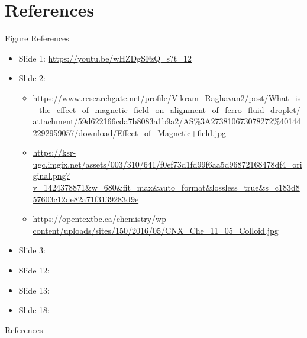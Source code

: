 \documentclass[9pt]{beamer}
\begin{document}
\section{References}
\begin{frame}{Figure References}
\begin{itemize}
	\item Slide 1: \url{https://youtu.be/wHZDgSFzQ_s?t=12}
	\item Slide 2:
	\begin{itemize}
		\item \url{https://www.researchgate.net/profile/Vikram\_Raghavan2/post/What\_is\_the\_effect\_of\_magnetic\_field\_on\_alignment\_of\_ferro\_fluid\_droplet/attachment/59d622166cda7b8083a1b9a2/AS\%3A273810673078272\%401442292959057/download/Effect+of+Magnetic+field.jpg}
		\item \url{https://ksr-ugc.imgix.net/assets/003/310/641/f0ef73d1fd99f6aa5d96872168478df4\_original.png?v=1424378871\&w=680\&fit=max\&auto=format\&lossless=true\&s=c183d857603c12de82a71f3139283d9e}
		\item \url{https://opentextbc.ca/chemistry/wp-content/uploads/sites/150/2016/05/CNX\_Che\_11\_05\_Colloid.jpg}
	\end{itemize}
	\item Slide 3: \cite{DrugTarget}
	\item Slide 12: \cite{DiffuseInterface}
	\item Slide 13: \cite{DiffuseInterface}
	\item Slide 18: \cite{DiffuseInterface}
\end{itemize}
\end{frame}

\tiny

\begin{frame}[allowframebreaks]{References}
	
	
\end{frame}
\end{document}

